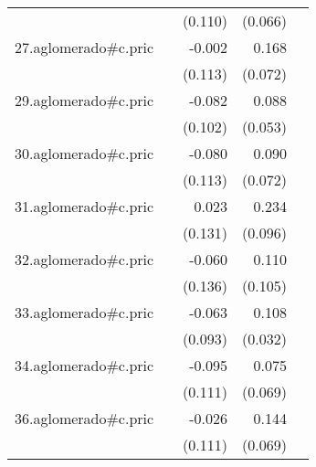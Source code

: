 {\begin{longtable}{l*{4}{D{.}{.}{-1}}}
            &                     &     (0.110)         &     (0.066)         &                     \\
\addlinespace
27.aglomerado#c.pric&                     &      -0.002         &       0.168\sym{*}  &                     \\
            &                     &     (0.113)         &     (0.072)         &                     \\
\addlinespace
29.aglomerado#c.pric&                     &      -0.082         &       0.088         &                     \\
            &                     &     (0.102)         &     (0.053)         &                     \\
\addlinespace
30.aglomerado#c.pric&                     &      -0.080         &       0.090         &                     \\
            &                     &     (0.113)         &     (0.072)         &                     \\
\addlinespace
31.aglomerado#c.pric&                     &       0.023         &       0.234\sym{*}  &                     \\
            &                     &     (0.131)         &     (0.096)         &                     \\
\addlinespace
32.aglomerado#c.pric&                     &      -0.060         &       0.110         &                     \\
            &                     &     (0.136)         &     (0.105)         &                     \\
\addlinespace
33.aglomerado#c.pric&                     &      -0.063         &       0.108\sym{***}&                     \\
            &                     &     (0.093)         &     (0.032)         &                     \\
\addlinespace
34.aglomerado#c.pric&                     &      -0.095         &       0.075         &                     \\
            &                     &     (0.111)         &     (0.069)         &                     \\
\addlinespace
36.aglomerado#c.pric&                     &      -0.026         &       0.144\sym{*}  &                     \\
            &                     &     (0.111)         &     (0.069)         &                     \\

\end{longtable}}
